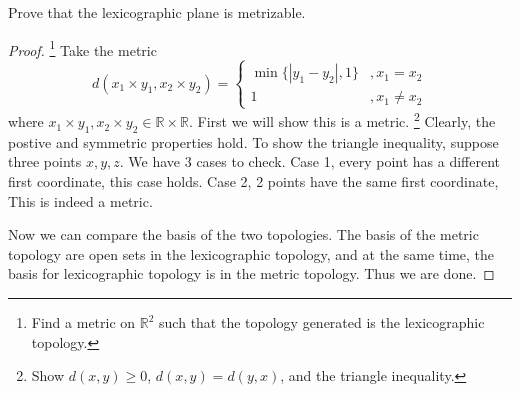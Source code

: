 \documentclass[../../main.tex]{subfiles}
\begin{document}
\begin{problem}[5]
    Prove that the lexicographic plane is metrizable.
\end{problem}
\begin{proof}
    \footnote{Find a metric on $\mathbb{R}^2$ such that the topology generated is the lexicographic topology.}
    Take the metric
    \[
        d(x_1 \times y_1, x_2 \times y_2) = \begin{cases}
            \min\{|y_1 - y_2|, 1\} &, x_1 = x_2 \\
            1 &, x_1 \ne x_2
        \end{cases}
    \]
    where $x_1 \times y_1, x_2 \times y_2 \in \mathbb{R} \times \mathbb{R}$.
    First we will show this is a metric.
    \footnote{Show $d(x, y) \ge 0$, $d(x, y) = d(y, x)$, and the triangle inequality.}
    Clearly, the postive and symmetric properties hold.
    To show the triangle inequality, suppose three points $x, y, z$.
    We have $3$ cases to check.
    Case 1, every point has a different first coordinate, this case holds.
    Case 2, 2 points have the same first coordinate, 
    This is indeed a metric.

    Now we can compare the basis of the two topologies.
    The basis of the metric topology are open sets in the lexicographic topology, and at the same time, the basis for lexicographic topology is in the metric topology.
    Thus we are done.
\end{proof}
\end{document}
